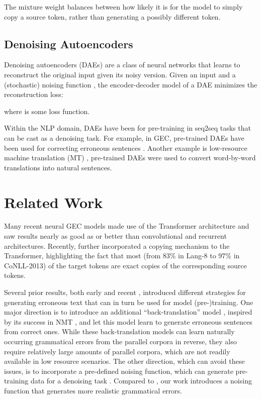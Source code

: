 \documentclass[11pt,a4paper]{article}
\begin{document}
The mixture weight balances between how likely it is for the model to simply copy a source token, rather than generating a possibly different token.

\subsection{Denoising Autoencoders}

Denoising autoencoders (DAEs) \cite{vincent2008extracting} are a class of neural networks that learns to reconstruct the original input given its noisy version. 
Given an input  and a (stochastic) noising function , the encoder-decoder model of a DAE minimizes the reconstruction loss:

where  is some loss function.

Within the NLP domain, DAEs have been for pre-training in seq2seq tasks that can be cast as a denoising task. 
For example, in GEC, pre-trained DAEs have been used for correcting erroneous sentences \cite{xie2018noising, zhao2019improving}.
Another example is low-resource machine translation (MT) \cite{lample2018phrase}, pre-trained DAEs were used to convert word-by-word translations into natural sentences.

\section{Related Work}

Many recent neural GEC models \cite{junczys2018approaching, lichtarge2018weakly, zhao2019improving} made use of the Transformer \cite{vaswani2017attention} architecture and saw results nearly as good as or better than convolutional \cite{chollampatt2018multilayer, chollampatt2018neural} and recurrent \cite{grundkiewicz2018near, ge2018fluency} architectures.
Recently, \citet{zhao2019improving} further incorporated a copying mechanism \cite{gu2016incorporating,see2017get,jia2016data} to the Transformer, highlighting the fact that most (from 83\% in Lang-8 to 97\% in CoNLL-2013) of the target tokens are exact copies of the corresponding source tokens. 

Several prior results, both early \cite{brockett2006correcting, felice2014generating} and recent \cite{ge2018fluency, xie2018noising, zhao2019improving}, introduced different strategies for generating erroneous text that can in turn be used for model (pre-)training.
One major direction is to introduce an additional ``back-translation'' model \cite{ge2018fluency, xie2018noising}, inspired by its success in NMT \cite{sennrich2016improving}, and let this model learn to generate erroneous sentences from correct ones.
While these back-translation models can learn naturally occurring grammatical errors from the parallel corpora in reverse, they also require relatively large amounts of parallel corpora, which are not readily available in low resource scenarios.
The other direction, which can avoid these issues, is to incorporate a pre-defined noising function, which can generate pre-training data for a denoising task \cite{zhao2019improving}. 
Compared to \cite{zhao2019improving}, our work introduces a noising function that generates more realistic grammatical errors.
\end{document}
